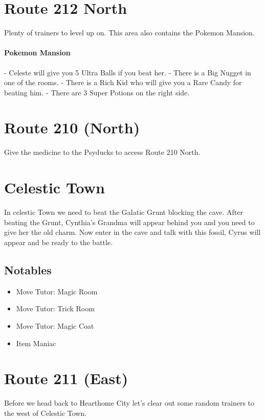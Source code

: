 \documentclass[11pt]{article}
\begin{document}
\section{Route 212 North}\label{sec:route-212-north}
Plenty of trainers to level up on.
This area also contains the Pokemon Mansion.

\paragraph{Pokemon Mansion}
- Celeste will give you 5 Ultra Balls if you beat her.
- There is a Big Nugget in one of the rooms.
- There is a Rich Kid who will give you a Rare Candy for beating him.
- There are 3 Super Potions on the right side.





\section{Route 210 (North)}\label{sec:route-210-(north)}
Give the medicine to the Psyducks to access Route 210 North.

\section{Celestic Town}\label{sec:celestic-town}
In celestic Town we need to beat the Galatic Grunt blocking the cave.
After beating the Grunt, Cynthia's Grandma will appear behind you
and you need to give her the old charm.
Now enter in the cave and talk with this fossil, Cyrus will appear and be ready to the battle.

\subsection{Notables}\label{subsec:notables-celestic}

\begin{itemize}
    \item Move Tutor: Magic Room
    \item Move Tutor: Trick Room
    \item Move Tutor: Magic Coat
    \item Item Maniac
\end{itemize}

\section{Route 211 (East)}\label{sec:Route_211_(East)}
Before we head back to Hearthome City let's clear out some random trainers to
the west of Celestic Town.
\end{document}
